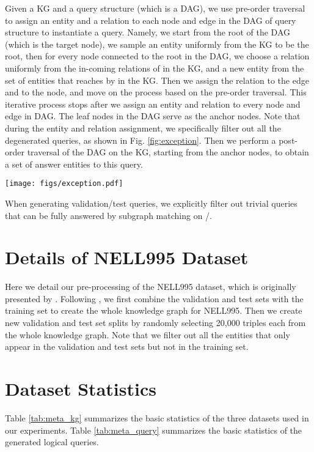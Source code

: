 Given a KG and a query structure (which is a DAG), we use pre-order traversal to assign an entity and a relation to each node and edge in the DAG of query structure to instantiate a query. Namely, we start from the root of the DAG (which is the target node), we sample an entity  uniformly from the KG to be the root, then for every node connected to the root in the DAG, we choose a relation  uniformly from the in-coming relations of  in the KG, and a new entity  from the set of entities that reaches  by  in the KG. Then we assign the relation  to the edge and  to the node, and move on the process based on the pre-order traversal. This iterative process stops after we assign an entity and relation to every node and edge in DAG. The leaf nodes in the DAG serve as the anchor nodes. Note that during the entity and relation assignment, we specifically filter out all the degenerated queries, as shown in Fig. \ref{fig:exception}. Then we perform a post-order traversal of the DAG on the KG, starting from the anchor nodes, to obtain a set of answer entities to this query.

\begin{figure*}[t]
\label{fig:exception}
\centering
    \texttt{[image: figs/exception.pdf]}
    \caption{Example of the degenerated queries, including (1)  and  appear along one path and (2) same anchor node and relation in intersections.}
\end{figure*}

When generating validation/test queries, we explicitly filter out trivial queries that can be fully answered by subgraph matching on /.
 


\section{Details of NELL995 Dataset} \label{app:nell}
Here we detail our pre-processing of the NELL995 dataset, which is originally presented by \citet{xiong2017deeppath}. 
Following \citet{allen2019understanding}, we first combine the validation and test sets with the training set to create the whole knowledge graph for NELL995. Then we create new validation and test set splits by randomly selecting 20,000 triples each from the whole knowledge graph. Note that we filter out all the entities that only appear in the validation and test sets but not in the training set. 

\newpage
\section{Dataset Statistics} \label{app:datastats}
Table \ref{tab:meta_kg} summarizes the basic statistics of the three datasets used in our experiments. Table \ref{tab:meta_query} summarizes the basic statistics of the generated logical queries.

